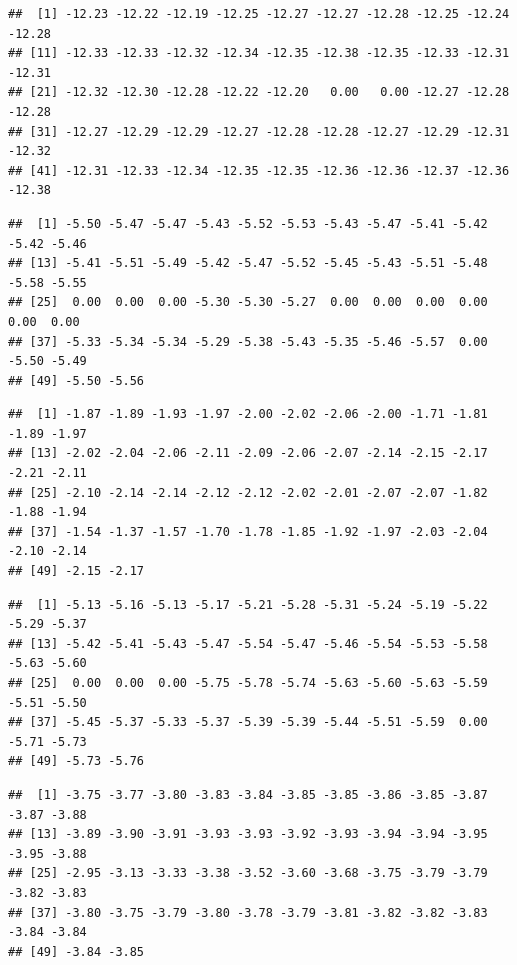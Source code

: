 \documentclass[
]{article}
\begin{document}
\begin{verbatim}
##  [1] -12.23 -12.22 -12.19 -12.25 -12.27 -12.27 -12.28 -12.25 -12.24 -12.28
## [11] -12.33 -12.33 -12.32 -12.34 -12.35 -12.38 -12.35 -12.33 -12.31 -12.31
## [21] -12.32 -12.30 -12.28 -12.22 -12.20   0.00   0.00 -12.27 -12.28 -12.28
## [31] -12.27 -12.29 -12.29 -12.27 -12.28 -12.28 -12.27 -12.29 -12.31 -12.32
## [41] -12.31 -12.33 -12.34 -12.35 -12.35 -12.36 -12.36 -12.37 -12.36 -12.38
\end{verbatim}

\begin{verbatim}
##  [1] -5.50 -5.47 -5.47 -5.43 -5.52 -5.53 -5.43 -5.47 -5.41 -5.42 -5.42 -5.46
## [13] -5.41 -5.51 -5.49 -5.42 -5.47 -5.52 -5.45 -5.43 -5.51 -5.48 -5.58 -5.55
## [25]  0.00  0.00  0.00 -5.30 -5.30 -5.27  0.00  0.00  0.00  0.00  0.00  0.00
## [37] -5.33 -5.34 -5.34 -5.29 -5.38 -5.43 -5.35 -5.46 -5.57  0.00 -5.50 -5.49
## [49] -5.50 -5.56
\end{verbatim}

\begin{verbatim}
##  [1] -1.87 -1.89 -1.93 -1.97 -2.00 -2.02 -2.06 -2.00 -1.71 -1.81 -1.89 -1.97
## [13] -2.02 -2.04 -2.06 -2.11 -2.09 -2.06 -2.07 -2.14 -2.15 -2.17 -2.21 -2.11
## [25] -2.10 -2.14 -2.14 -2.12 -2.12 -2.02 -2.01 -2.07 -2.07 -1.82 -1.88 -1.94
## [37] -1.54 -1.37 -1.57 -1.70 -1.78 -1.85 -1.92 -1.97 -2.03 -2.04 -2.10 -2.14
## [49] -2.15 -2.17
\end{verbatim}

\begin{verbatim}
##  [1] -5.13 -5.16 -5.13 -5.17 -5.21 -5.28 -5.31 -5.24 -5.19 -5.22 -5.29 -5.37
## [13] -5.42 -5.41 -5.43 -5.47 -5.54 -5.47 -5.46 -5.54 -5.53 -5.58 -5.63 -5.60
## [25]  0.00  0.00  0.00 -5.75 -5.78 -5.74 -5.63 -5.60 -5.63 -5.59 -5.51 -5.50
## [37] -5.45 -5.37 -5.33 -5.37 -5.39 -5.39 -5.44 -5.51 -5.59  0.00 -5.71 -5.73
## [49] -5.73 -5.76
\end{verbatim}

\begin{verbatim}
##  [1] -3.75 -3.77 -3.80 -3.83 -3.84 -3.85 -3.85 -3.86 -3.85 -3.87 -3.87 -3.88
## [13] -3.89 -3.90 -3.91 -3.93 -3.93 -3.92 -3.93 -3.94 -3.94 -3.95 -3.95 -3.88
## [25] -2.95 -3.13 -3.33 -3.38 -3.52 -3.60 -3.68 -3.75 -3.79 -3.79 -3.82 -3.83
## [37] -3.80 -3.75 -3.79 -3.80 -3.78 -3.79 -3.81 -3.82 -3.82 -3.83 -3.84 -3.84
## [49] -3.84 -3.85
\end{verbatim}
\end{document}
